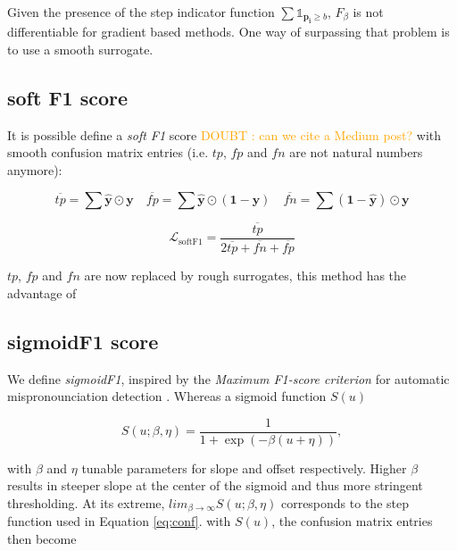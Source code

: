 \documentclass[sigconf,natbib,screen=true,review=true,anonymous]{acmart}
\newcommand\doubt[1]{\textcolor{orange}{DOUBT : #1}}
\begin{document}
Given the presence of the step indicator function \(\sum \mathds{1}_{\mathbf{p_i} \geq b}\), \(F_\beta\) is not differentiable for gradient based methods. One way of surpassing that problem is to use a smooth surrogate.

\subsection{soft F1 score}
\label{sec:org6c9f8a3}

It is possible define a \emph{soft F1} score \cite{softF1} \doubt{can we cite a Medium post?} with smooth confusion matrix entries (i.e. \(tp\), \(fp\) and \(fn\) are not natural numbers anymore):

$$
\overline{tp}=\sum \hat{\mathbf{y}} \odot \mathbf{y} \quad \overline{fp} = \sum \hat{\mathbf{y}} \odot (\mathbf{1}- \mathbf{y}) \quad \overline{fn} = \sum (\mathbf{1} - \hat{\mathbf{y}}) \odot \mathbf{y}
$$

\begin{equation}
\mathcal{L}_{\text {softF1}}= \frac{\overline{tp}}{2 \overline{tp}+ \overline{fn}+ \overline{fp}}
\end{equation}

\(tp\), \(fp\) and \(fn\) are now replaced by rough surrogates, this method has the advantage of 


\subsection{sigmoidF1 score}
\label{sec:orgf27ddd5}

We define \emph{sigmoidF1}, inspired by the \emph{Maximum F1-score criterion} for automatic mispronounciation detection \cite{sigmoid}. Whereas a sigmoid function \(S(u)\)

\begin{equation}
S(u; \beta, \eta)=\frac{1}{1+\exp (-\beta (u + \eta))},
\end{equation}

with \(\beta\) and \(\eta\) tunable parameters for slope and offset respectively. Higher \(\beta\) results in steeper slope at the center of the sigmoid and thus more stringent thresholding. At its extreme, \(lim_{\beta\to\infty} S(u; \beta, \eta)\) corresponds to the step function used in Equation \ref{eq:conf}. with \(S(u)\), the confusion matrix entries then become
\end{document}
